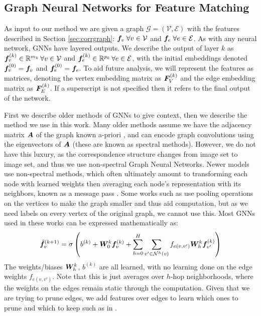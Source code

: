 \documentclass{article} %
\begin{document}
\subsection{Graph Neural Networks for Feature Matching} \label{sec:gnns}
As input to our method we are given a graph $\mathcal{G} = (\mathcal{V}, \mathcal{E})$ with the features described in Section \ref{sec:corrgraph}: ${\bm{f}}_v \; \forall v \in \mathcal{V}$ and ${\bm{f}}_e \; \forall e \in \mathcal{E}$.
As with any neural network, GNNs have layered outputs.
We describe the output of layer $k$ as ${\bm{f}}_v^{(k)} \in {\mathbb{R}}^{m_k} \, \forall v \in \mathcal{V}$ and ${\bm{f}}_e^{(k)} \in {\mathbb{R}}^{p_k}\, \forall e \in \mathcal{E}$, with the initial embeddings denoted ${\bm{f}}_v^{(0)} = {\bm{f}}_v$ and ${\bm{f}}_e^{(0)} = {\bm{f}}_e$.
To aid future analysis, we will represent the features as matrices, denoting the vertex embedding matrix as ${\bm{F}}_V^{(k)}$ and the edge embedding matrix as ${\bm{F}}_E^{(k)}$.
If a superscript is not specified then it refers to the final output of the network.

First we describe older methods of GNNs to give context, then we describe the method we use in this work.
Many older methods assume we have the adjacency matrix ${\bm{A}}$ of the graph known a-priori \cite{bruna2013spectral}, and can encode graph convolutions using the eigenvectors of ${\bm{A}}$ (these are known as spectral methods).
However, we do not have this luxury, as the correspondence structure changes from image set to image set, and thus we use non-spectral Graph Neural Networks.
Newer models use non-spectral methods, which often ultimately amount to transforming each node with learned weights then averaging each node's representation with its neighbors, known as a message pass \citep{kipf2017semi, defferrard2016convolutional, gama2018mimo, gama2018convolutional}.
Some works such as \cite{gama2019convolutional} use pooling operations on the vertices to make the graph smaller and thus aid computation, but as we need labels on every vertex of the original graph, we cannot use this.
Most GNNs used in these works can be expressed mathematically as:
\begin{align*}
\tilde{{\bm{f}}}_v^{(k+1)} =&\; \sigma\left( b^{(k)} + {\bm{W}}_0^{k} {\bm{f}}_{v}^{(k)} + \sum_{h=0}^H \sum_{v' \in \mathcal{N}^{h}(v)} f_{e(v,v')} {\bm{W}}_{h}^{k} {\bm{f}}_{v'}^{(k)} \right) \\
\end{align*}
The weights/biases ${\bm{W}}_{h}^{k}$, $b^{(k)}$ are all learned, with no learning done on the edge weights $f_{e(v,v')}$. 
Note that this is just averages over $h$-hop neighborhoods, where the weights on the edges remain static through the computation.
Given that we are trying to prune edges, we add features over edges to learn which ones to prune and which to keep such as in \cite{scarselli2009graph}.
\end{document}
